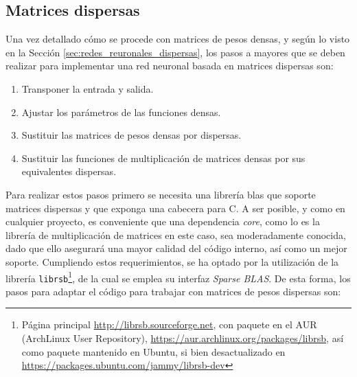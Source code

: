 \subsection{Matrices dispersas}
\label{ssec:gdin_matrices_dispersas}
Una vez detallado cómo se procede con matrices de pesos densas, y según lo visto en la Sección \ref{sec:redes_reuronales_dispersas}, los pasos a mayores que se deben realizar para implementar una red neuronal basada en matrices dispersas son:

\begin{enumerate}
    \item Transponer la entrada y salida.
    \item Ajustar los parámetros de las funciones densas.
    \item Sustituir las matrices de pesos densas por dispersas.
    \item Sustituir las funciones de multiplicación de matrices densas por sus equivalentes dispersas.
\end{enumerate}

Para realizar estos pasos primero se necesita una librería \acrshort{blas} que soporte matrices dispersas y que exponga una cabecera para C. A ser posible, y como en cualquier proyecto, es conveniente que una dependencia \textit{core}, como lo es la librería de multiplicación de matrices en este caso, sea moderadamente conocida, dado que ello asegurará una mayor calidad del código interno, así como un mejor soporte. Cumpliendo estos requerimientos, se ha optado por la utilización de la librería \texttt{librsb}\footnote{Página principal \url{http://librsb.sourceforge.net}, con paquete en el AUR (ArchLinux User Repository), \url{https://aur.archlinux.org/packages/librsb}, así como paquete mantenido en Ubuntu, si bien desactualizado en \url{https://packages.ubuntu.com/jammy/librsb-dev}}, de la cual se emplea su interfaz \textit{Sparse BLAS}. De esta forma, los pasos para adaptar el código para trabajar con matrices de pesos dispersas son:

